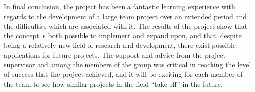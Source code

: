 In final conclusion, the project has been a fantastic learning experience with regards to the development of a large team project over an extended period and the difficulties which are associated with it. The results of the project show that the concept is both possible to implement and expand upon, and that, despite being a relatively new field of research and development, there exist possible applications for future projects. The support and advice from the project supervisor and among the members of the group was critical in reaching the level of success that the project achieved, and it will be exciting for each member of the team to see how similar projects in the field ``take off'' in the future.